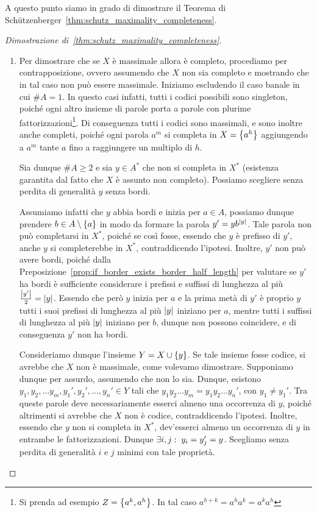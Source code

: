 A questo punto siamo in grado di dimostrare il Teorema di Schützenberger~\ref{thm:schutz_maximality_completeness}.
\begin{proof}[Dimostrazione di~\ref{thm:schutz_maximality_completeness}]
  \begin{enumerate}
    \item Per dimostrare che se \(X\) è massimale allora è completo, procediamo per contrapposizione, ovvero assumendo che \(X\) non sia completo e mostrando che in tal caso non può essere massimale.
      Iniziamo escludendo il caso banale in cui \(\# A = 1\). In questo casi infatti, tutti i codici possibili sono singleton, poiché ogni altro insieme di parole porta a parole con plurime fattorizzazioni\footnote{Si prenda ad esempio \(Z = \set{a^k,a^h}\). In tal caso \(a^{h+k} = a^h a^k = a^k a^h\)}.
      Di conseguenza tutti i codici sono massimali, e sono inoltre anche completi, poiché ogni parola \(a^m\) si completa in \(X = \set{a^h}\) aggiungendo a \(a^m\) tante \(a\) fino a raggiungere un multiplo di \(h\).

      Sia dunque \(\# A \geq 2\) e sia \(y \in A^*\) che non si completa in \(X^*\) (esistenza garantita dal fatto che \(X\) è assunto non completo).
      Possiamo scegliere senza perdita di generalità \(y\) senza bordi.

      Assumiamo infatti che \(y\) abbia bordi e inizia per \(a \in A\), possiamo dunque prendere \(b \in A\setminus\set{a}\) in modo da formare la parola \(y' = yb^{\left|y\right|}\).
      Tale parola non può completarsi in \(X^*\), poiché se così fosse, essendo che \(y\) è prefisso di \(y'\), anche \(y\) si completerebbe in \(X^*\), contraddicendo l'ipotesi.
      Inoltre, \(y'\) non può avere bordi, poiché dalla Preposizione~\ref{prop:if_border_exists_border_half_length} per valutare se \(y'\) ha bordi è sufficiente considerare i prefissi e suffissi di lunghezza al più \(\frac{\left|y'\right|}{2} = \left|y\right|\).
      Essendo che però \(y\) inizia per \(a\) e la prima metà di \(y'\) è proprio \(y\) tutti i suoi prefissi di lunghezza al più \(\left|y\right|\) iniziano per \(a\), mentre tutti i suffissi di lunghezza al più \(\left|y\right|\) iniziano per \(b\), dunque non possono coincidere, e di conseguenza \(y'\) non ha bordi.
      
      Consideriamo dunque l'insieme \(Y=X\cup\set{y}\). Se tale insieme fosse codice, si avrebbe che \(X\) non è massimale, come volevamo dimostrare.
      Supponiamo dunque per assurdo, assumendo che non lo sia.
      Dunque, esistono \(y_1,y_2,\ldots y_m,y_1',y_2',\ldots,y_n' \in Y\) tali che \(y_1y_2\ldots y_m = y_1y_2\ldots y_n'\), con \(y_1\neq y_1'\).
      Tra queste parole deve necessariamente esserci almeno una occorrenza di \(y\), poiché altrimenti si avrebbe che \(X\) non è codice, contraddicendo l'ipotesi.
      Inoltre, essendo che \(y\) non si completa in \(X^*\), dev'esserci almeno un occorrenza di \(y\) in entrambe le fattorizzazioni.
      Dunque \(\exists i,j :\; y_i=y_j'=y\). Scegliamo senza perdita di generalità \(i\) e \(j\) minimi con tale proprietà.


\end{enumerate}
\end{proof}
